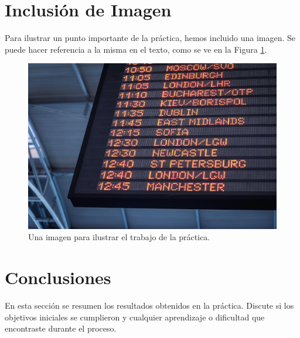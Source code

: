 \documentclass[12pt]{article}
\begin{document}
\section{Inclusión de Imagen}
Para ilustrar un punto importante de la práctica, hemos incluido una imagen. Se puede hacer referencia a la misma en el texto, como se ve en la Figura \ref{fig:mi_imagen}.

\begin{figure}[h!]
    \centering
    \includegraphics[width=0.7\linewidth]{Imagen.png} %
    \caption{Una imagen para ilustrar el trabajo de la práctica.}
    \label{fig:mi_imagen}
\end{figure}

\section{Conclusiones}
\label{sec:conclusiones}
En esta sección se resumen los resultados obtenidos en la práctica. Discute si los objetivos iniciales se cumplieron y cualquier aprendizaje o dificultad que encontraste durante el proceso.
\end{document}
